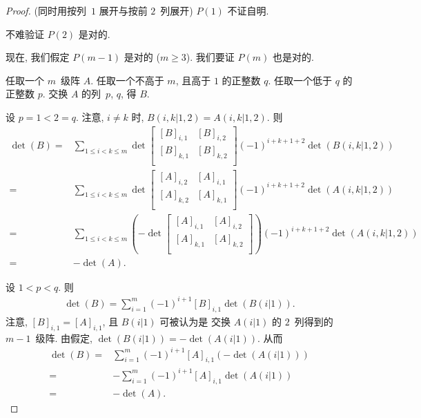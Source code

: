 \documentclass[../libro.tex]{subfiles}
\begin{document}
\begin{proof}
    (同时用按列~\(1\) 展开与按前 \(2\)~列展开)
    \(P(1)\) 不证自明.

    不难验证 \(P(2)\) 是对的.

    现在, 我们假定 \(P(m-1)\) 是对的 (\(m \geq 3\)).
    我们要证 \(P(m)\) 也是对的.

    任取一个 \(m\)~级阵 \(A\).
    任取一个不高于 \(m\), 且高于 \(1\) 的正整数 \(q\).
    任取一个低于 \(q\) 的正整数 \(p\).
    交换 \(A\) 的列~\(p\), \(q\), 得 \(B\).

    设 \(p = 1 < 2 = q\).
    注意, \(i \neq k\) 时,
    \(B(i,k|1,2) = A(i,k|1,2)\).
    则
    \begin{align*}
        \det {(B)}
        = {} &
        \sum_{1 \leq i < k \leq m}
        {\det {
                \begin{bmatrix}
                    [B]_{i,1} & [B]_{i,2} \\
                    [B]_{k,1} & [B]_{k,2} \\
                \end{bmatrix}
            }
            (-1)^{i+k+1+2}
        \det {(B(i,k|1,2))}}
        \\
        = {} &
        \sum_{1 \leq i < k \leq m}
        {\det {
                \begin{bmatrix}
                    [A]_{i,2} & [A]_{i,1} \\
                    [A]_{k,2} & [A]_{k,1} \\
                \end{bmatrix}
            }
            (-1)^{i+k+1+2}
        \det {(A(i,k|1,2))}}
        \\
        = {} &
        \sum_{1 \leq i < k \leq m}
        {\left(-\det {
                    \begin{bmatrix}
                        [A]_{i,1} & [A]_{i,2} \\
                        [A]_{k,1} & [A]_{k,2} \\
                    \end{bmatrix}
            }\right)
            (-1)^{i+k+1+2}
        \det {(A(i,k|1,2))}}
        \\
        = {} &
        {-} \det {(A)}.
    \end{align*}

    设 \(1 < p < q\).
    则
    \begin{align*}
        \det {(B)}
        = \sum_{i = 1}^{m}
        {(-1)^{i + 1} [B]_{i,1} \det {(B(i|1))}}.
    \end{align*}
    注意, \([B]_{i,1} = [A]_{i,1}\),
    且 \(B(i|1)\) 可被认为是%
    交换 \(A(i|1)\) 的 \(2\)~列得到的 \(m-1\)~级阵.
    由假定, \(\det {(B(i|1))} = -\det {(A(i|1))}\).
    从而
    \begin{align*}
        \det {(B)}
        = {} &
        \sum_{i = 1}^{m}
        {(-1)^{i + 1} [A]_{i,1} (-\det {(A(i|1))})}
        \\
        = {} &
        {-} \sum_{i = 1}^{m}
        {(-1)^{i + 1} [A]_{i,1} \det {(A(i|1))}}
        \\
        = {} &
        {-} \det {(A)}.
    \end{align*}


\end{proof}
\end{document}
